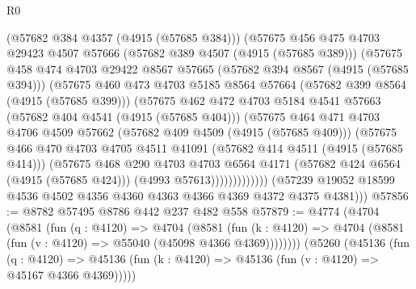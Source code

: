 \begin{lexlean}{R0}
\begin{coremodule}
                  (@57682 @384 @4357 (@4915 (@57685 @384)))
                  (@57675
                    @456
                    @475
                    @4703
                    @29423
                    @4507
                    @57666
                    (@57682 @389 @4507 (@4915 (@57685 @389)))
                    (@57675
                      @458
                      @474
                      @4703
                      @29422
                      @8567
                      @57665
                      (@57682 @394 @8567 (@4915 (@57685 @394)))
                      (@57675
                        @460
                        @473
                        @4703
                        @5185
                        @8564
                        @57664
                        (@57682 @399 @8564 (@4915 (@57685 @399)))
                        (@57675
                          @462
                          @472
                          @4703
                          @5184
                          @4541
                          @57663
                          (@57682 @404 @4541 (@4915 (@57685 @404)))
                          (@57675
                            @464
                            @471
                            @4703
                            @4706
                            @4509
                            @57662
                            (@57682 @409 @4509 (@4915 (@57685 @409)))
                            (@57675
                              @466
                              @470
                              @4703
                              @4705
                              @4511
                              @41091
                              (@57682 @414 @4511 (@4915 (@57685 @414)))
                              (@57675
                                @468
                                @290
                                @4703
                                @4703
                                @6564
                                @4171
                                (@57682 @424 @6564 (@4915 (@57685 @424)))
                                (@4993 @57613)))))))))))))
        (@57239 @19052 @18599 @4536 @4502 @4356 @4360 @4363 @4366 @4369 @4372 @4375 @4381)))
@57856 := @8782 @57495 @8786 @442 @237 @482 @558
@57879 := @4774
    (@4704
      (@8581
        (fun (q : @4120) =>
        @4704
          (@8581
            (fun (k : @4120) => @4704 (@8581 (fun (v : @4120) => @55040 (@45098 @4366 @4369))))))))
    (@5260
      (@45136
        (fun (q : @4120) =>
        @45136 (fun (k : @4120) => @45136 (fun (v : @4120) => @45167 @4366 @4369)))))

\end{coremodule}
\end{lexlean}
